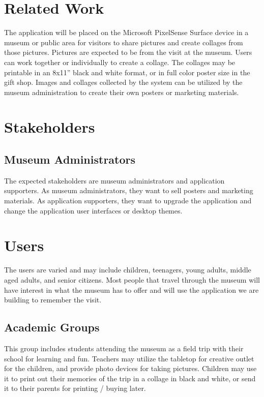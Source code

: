 \documentclass{tei2013}
\begin{document}
\section{Related Work}
The application will be placed on the Microsoft PixelSense Surface device in a museum or public area for visitors to share pictures and create collages from those pictures.  Pictures are expected to be from the visit at the museum.  Users can work together or individually to create a collage.  The collages may be printable in an 8x11” black and white format, or in full color poster size in the gift shop.  Images and collages collected by the system can be utilized by the museum administration to create their own posters or marketing materials.

\section{Stakeholders}

\subsection{Museum Administrators}
The expected stakeholders are museum administrators and application supporters.
As museum administrators, they want to sell posters and marketing materials.
As application supporters, they want to upgrade the application and change the application user interfaces or desktop themes.%
\section{Users}
The users are varied and may include children, teenagers, young adults, middle aged adults, and senior citizens. Most people that travel through the museum will have interest in what the museum has to offer and will use the application we are building to remember the visit. 
\subsection{Academic Groups}
This group includes students attending the museum as a field trip with their school for learning and fun.  Teachers may utilize the tabletop for creative outlet for the children, and provide photo devices for taking pictures.  Children may use it to print out their memories of the trip in a collage in black and white, or send it to their parents for printing / buying later.
\end{document}
